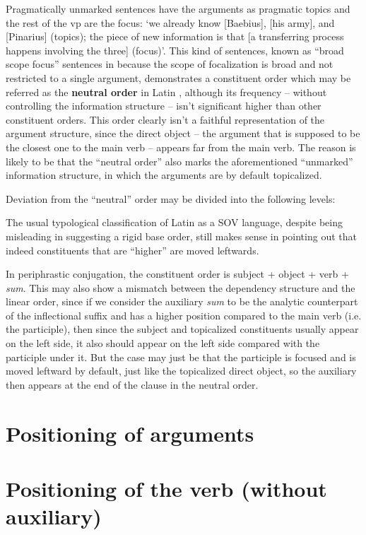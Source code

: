 \documentclass[a4paper, oneside, 12pt]{report}
\newcommand*{\citepage}[1]{p.~{#1}}
\newcommand*{\concept}[1]{\textbf{#1}}
\newcommand{\form}[1]{\emph{#1}}
\newcommand{\translate}[1]{`#1'}
\begin{document}
Pragmatically unmarked sentences have the arguments as pragmatic topics 
and the rest of the \acs{vp} are the focus:
\translate{we already know [Baebius], [his army], and [Pinarius] (topics);
the piece of new information is that 
[a transferring process happens involving the three] (focus)}.
This kind of sentences, known as ``broad scope focus'' sentences 
in \citet[\citepage{15}]{devine2006latin}
because the scope of focalization is broad
and not restricted to a single argument,
demonstrates a constituent order which may be referred as the \concept{neutral order} in Latin
\citep[\citepage{79}]{devine2006latin},
although its frequency -- without controlling the information structure -- 
isn't significant higher than other constituent orders.
This order clearly isn't a faithful representation 
of the argument structure, 
since the direct object -- the argument that is supposed to be the closest one to the main verb -- 
appears far from the main verb. 
The reason is likely to be that the ``neutral order'' also marks 
the aforementioned ``unmarked'' information structure, 
in which the arguments are by default topicalized.

Deviation from the ``neutral'' order may be divided into the following levels:

The usual typological classification of Latin as a SOV language, 
despite being misleading in suggesting a rigid base order, 
still makes sense in pointing out that indeed constituents that are ``higher'' are moved leftwards.

In periphrastic conjugation,
the constituent order is subject + object + verb + \form{sum}.
This may also show a mismatch between the dependency structure and the linear order,
since if we consider the auxiliary \form{sum} to be 
the analytic counterpart of the inflectional suffix 
and has a higher position compared to the main verb (i.e. the participle),
then since the subject and topicalized constituents usually appear on the left side, 
it also should appear on the left side compared with the participle under it.
But the case may just be that the participle is focused and is moved leftward by default, 
just like the topicalized direct object,
so the auxiliary then appears at the end of the clause in the neutral order.

\section{Positioning of arguments}

\section{Positioning of the verb (without auxiliary)}
\end{document}
